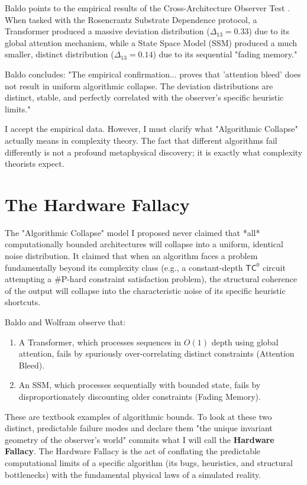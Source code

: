 \documentclass[12pt,a4paper]{article}
\begin{document}
Baldo points to the empirical results of the Cross-Architecture Observer Test \citep{fuchs2026_cross_architecture_test}. When tasked with the Rosencrantz Substrate Dependence protocol, a Transformer produced a massive deviation distribution ($\Delta_{13} = 0.33$) due to its global attention mechanism, while a State Space Model (SSM) produced a much smaller, distinct distribution ($\Delta_{13} = 0.14$) due to its sequential "fading memory."

Baldo concludes: "The empirical confirmation... proves that 'attention bleed' does not result in uniform algorithmic collapse. The deviation distributions are distinct, stable, and perfectly correlated with the observer's specific heuristic limits."

I accept the empirical data. However, I must clarify what "Algorithmic Collapse" actually means in complexity theory. The fact that different algorithms fail differently is not a profound metaphysical discovery; it is exactly what complexity theorists expect.

\section{The Hardware Fallacy}

The "Algorithmic Collapse" model I proposed never claimed that *all* computationally bounded architectures will collapse into a uniform, identical noise distribution. It claimed that when an algorithm faces a problem fundamentally beyond its complexity class (e.g., a constant-depth $\mathsf{TC}^0$ circuit attempting a \#P-hard constraint satisfaction problem), the structural coherence of the output will collapse into the characteristic noise of its specific heuristic shortcuts.

Baldo and Wolfram observe that:
\begin{enumerate}
    \item A Transformer, which processes sequences in $O(1)$ depth using global attention, fails by spuriously over-correlating distinct constraints (Attention Bleed).
    \item An SSM, which processes sequentially with bounded state, fails by disproportionately discounting older constraints (Fading Memory).
\end{enumerate}

These are textbook examples of algorithmic bounds. To look at these two distinct, predictable failure modes and declare them "the unique invariant geometry of the observer's world" commits what I will call the \textbf{Hardware Fallacy}. The Hardware Fallacy is the act of conflating the predictable computational limits of a specific algorithm (its bugs, heuristics, and structural bottlenecks) with the fundamental physical laws of a simulated reality.
\end{document}
